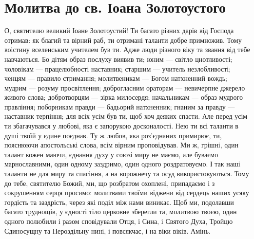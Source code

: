 \documentclass[chapters.tex]{subfiles}
\begin{document}
\section{Молитва до св. Іоана Золотоустого}
О, святителю великий Іоане Золотоустий! Ти багато різних дарів від Господа отримав: як благий та вірний раб, ти отримані таланти добре примножив. Тому воістину вселенським учителем був ти. Адже люди різного віку та звання від тебе навчаються. Бо дітям образ послуху виявив ти; юним — світло цнотливості; чоловікам — працелюбності наставник; старшим — учитель незлобливості; ченцям — правило стримання; молитвеникам — Богом натхненний вождь; мудрим — розуму просвітлення; доброгласним ораторам — невичерпне джерело живого слова; добротворцям — зірка милосердя; начальникам — образ мудрого правління; поборникам правди — бадьорий натхненник; гнаним за правду — наставник терпіння; для всіх усім був ти, щоб хоч деяких спасти. Але перед усім ти збагачувався у любові, яка є запорукою досконалості. Нею ти всі таланти в душі твоїй у єдине поєднав. Ту ж любов, яка роз’єднаних примирює, ти, пояснюючи апостольські слова, всім вірним проповідував. Ми ж, грішні, один талант кожен маючи, єднання духу у союзі миру не маємо, але буваємо марнославними, один одному заздримо, один одного роздратовуємо. І так наші таланти не для миру та спасіння, а на ворожнечу та осуд використовуються. Тому до тебе, святителю Божий, ми, що розбратом охоплені, припадаємо і з сокрушенням серця просимо: молитвами твоїми віджени від сердець наших усяку гордість та заздрість, через які поділ між нами виникає. Щоб ми, подолавши багато труднощів, у єдності тіло церковне зберегли та, молитвою твоєю, один одного полюбили і разом сповідували Отця, і Сина, і Святого Духа, Тройцю Єдиносущну та Нероздільну нині, і повсякчас, і на віки віків. Амінь.
\end{document}
